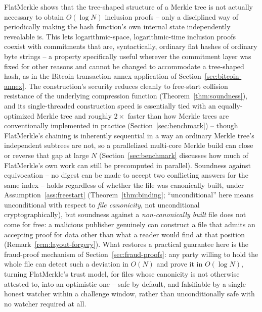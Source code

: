 FlatMerkle shows that the tree-shaped structure of a Merkle tree is not
actually necessary to obtain $O(\log N)$ inclusion proofs -- only a
disciplined way of periodically making the hash function's own internal
state independently revealable is. This lets logarithmic-space,
logarithmic-time inclusion proofs coexist with commitments that are,
syntactically, ordinary flat hashes of ordinary byte strings -- a property
specifically useful wherever the commitment layer
was fixed for other reasons and cannot be changed to accommodate a
tree-shaped hash, as in the Bitcoin transaction annex application of
Section~\ref{sec:bitcoin-annex}. The construction's security reduces
cleanly to free-start collision resistance of the underlying compression
function (Theorem~\ref{thm:soundness}), and its single-threaded
construction speed is essentially tied with an equally-optimized Merkle
tree and roughly $2\times$ faster than how Merkle trees are conventionally
implemented in practice (Section~\ref{sec:benchmark}) -- though FlatMerkle's
chaining is inherently sequential in a way an ordinary Merkle tree's
independent subtrees are not, so a parallelized multi-core Merkle build can
close or reverse that gap at large $N$ (Section~\ref{sec:benchmark}
discusses how much of FlatMerkle's own work can still be precomputed in
parallel). Soundness against equivocation --
no digest can be made to accept two conflicting answers for the same index
-- holds regardless of whether the file was canonically built, under
Assumption~\ref{ass:freestart} (Theorem~\ref{thm:binding}; ``unconditional''
here means unconditional with respect to \emph{file canonicity}, not
unconditional cryptographically), but soundness against
a \emph{non-canonically built} file does not come for free: a malicious
publisher genuinely can construct a file that admits an accepting proof for
data other than what a reader would find at that position
(Remark~\ref{rem:layout-forgery}). What restores a practical guarantee here
is the fraud-proof mechanism of Section~\ref{sec:fraud-proofs}: any party
willing to hold the whole file can detect such a deviation in $O(N)$ and
prove it in $O(\log N)$, turning FlatMerkle's trust model, for files whose
canonicity is not otherwise attested to, into an optimistic one -- safe by
default, and falsifiable by a single honest watcher within a challenge
window, rather than unconditionally safe with no watcher required at all.
